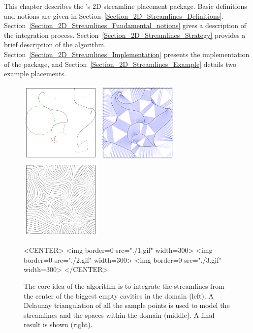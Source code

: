 \newcommand{\streamlinecomment}[1]{}

This chapter describes the \cgal's 2D streamline placement package.
Basic definitions and notions are given in
Section~\ref{Section_2D_Streamlines_Definitions}.
Section~\ref{Section_2D_Streamlines_Fundamental_notions} gives a
description of the integration
process. Section~\ref{Section_2D_Streamlines_Strategy} provides a
brief description of the algorithm.
Section~\ref{Section_2D_Streamlines_Implementation} presents the
implementation of the package, and
Section~\ref{Section_2D_Streamlines_Example} details two example
placements.

\begin{figure}[h!]
\begin{ccTexOnly}
\begin{center}
\includegraphics[width=4cm]{Stream_lines_2/1} \hspace*{0.5cm} 
\includegraphics[width=4cm]{Stream_lines_2/2} \hspace*{0.5cm} 
\includegraphics[width=4cm]{Stream_lines_2/3}
\end{center}
\end{ccTexOnly}

\label{illustration}
\begin{ccHtmlOnly}
<CENTER>
<img border=0 src="./1.gif" width=300>
<img border=0 src="./2.gif" width=300>
<img border=0 src="./3.gif" width=300>
</CENTER>
\end{ccHtmlOnly}
\begin{center}
\caption{The core idea of the algorithm is to integrate the
streamlines from the center of the biggest empty cavities in the
domain (left). A Delaunay triangulation of all the sample points is
used to model the streamlines and the spaces within the domain
(middle). A final result is shown (right).}
\end{center}
\end{figure}

